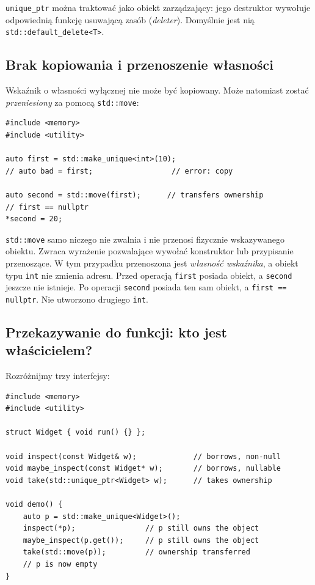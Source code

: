 \texttt{unique\_ptr} można traktować jako obiekt zarządzający:
jego destruktor wywołuje odpowiednią funkcję usuwającą zasób
(\emph{deleter}). Domyślnie jest nią \texttt{std::default\_delete<T>}.

\subsection{Brak kopiowania i przenoszenie własności}

Wskaźnik o własności wyłącznej nie może być kopiowany.
Może natomiast zostać \emph{przeniesiony} za pomocą
\texttt{std::move}:

\begin{lstlisting}
#include <memory>
#include <utility>

auto first = std::make_unique<int>(10);
// auto bad = first;                  // error: copy

auto second = std::move(first);      // transfers ownership
// first == nullptr
*second = 20;
\end{lstlisting}

\texttt{std::move} samo niczego nie zwalnia i nie przenosi fizycznie
wskazywanego obiektu. Zwraca wyrażenie pozwalające wywołać konstruktor
lub przypisanie przenoszące. W tym przypadku przenoszona jest
\emph{własność wskaźnika}, a obiekt typu \texttt{int} nie zmienia adresu.
Przed operacją \texttt{first} posiada obiekt, a \texttt{second} jeszcze
nie istnieje. Po operacji \texttt{second} posiada ten sam obiekt,
a \texttt{first == nullptr}. Nie utworzono drugiego \texttt{int}.

\subsection{Przekazywanie do funkcji: kto jest właścicielem?}

Rozróżnijmy trzy interfejsy:

\begin{lstlisting}
#include <memory>
#include <utility>

struct Widget { void run() {} };

void inspect(const Widget& w);             // borrows, non-null
void maybe_inspect(const Widget* w);       // borrows, nullable
void take(std::unique_ptr<Widget> w);      // takes ownership

void demo() {
    auto p = std::make_unique<Widget>();
    inspect(*p);                // p still owns the object
    maybe_inspect(p.get());     // p still owns the object
    take(std::move(p));         // ownership transferred
    // p is now empty
}
\end{lstlisting}

